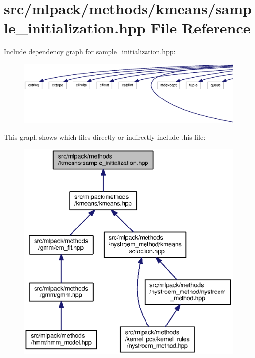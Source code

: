 \section{src/mlpack/methods/kmeans/sample\+\_\+initialization.hpp File Reference}
\label{sample__initialization_8hpp}
Include dependency graph for sample\+\_\+initialization.\+hpp\+:
\nopagebreak
\begin{figure}[H]
\begin{center}
\leavevmode
\includegraphics[width=350pt]{sample__initialization_8hpp__incl}
\end{center}
\end{figure}
This graph shows which files directly or indirectly include this file\+:
\nopagebreak
\begin{figure}[H]
\begin{center}
\leavevmode
\includegraphics[width=350pt]{sample__initialization_8hpp__dep__incl}
\end{center}
\end{figure}
